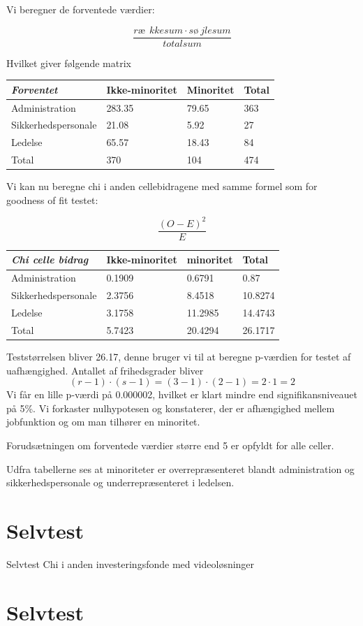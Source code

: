\documentclass[]{book}
\begin{document}
Vi beregner de forventede værdier:

\[\frac{ræ\ \ kkesum\cdot sø\ jlesum}{totalsum}\]

Hvilket giver følgende matrix

\begin{longtable}[]{@{}llll@{}}
\toprule
\textbf{\emph{Forventet}} & Ikke-minoritet & Minoritet & Total\tabularnewline
\midrule
\endhead
Administration & 283.35 & 79.65 & 363\tabularnewline
Sikkerhedspersonale & 21.08 & 5.92 & 27\tabularnewline
Ledelse & 65.57 & 18.43 & 84\tabularnewline
Total & 370 & 104 & 474\tabularnewline
\bottomrule
\end{longtable}

Vi kan nu beregne chi i anden cellebidragene med samme formel som for goodness of fit testet:

\[\frac{(O-E)^2}{E}\]

\begin{longtable}[]{@{}llll@{}}
\toprule
\textbf{\emph{Chi celle bidrag}} & Ikke-minoritet & minoritet & Total\tabularnewline
\midrule
\endhead
Administration & 0.1909 & 0.6791 & 0.87\tabularnewline
Sikkerhedspersonale & 2.3756 & 8.4518 & 10.8274\tabularnewline
Ledelse & 3.1758 & 11.2985 & 14.4743\tabularnewline
Total & 5.7423 & 20.4294 & 26.1717\tabularnewline
\bottomrule
\end{longtable}

Teststørrelsen bliver 26.17, denne bruger vi til at beregne p-værdien for testet af uafhængighed. Antallet af frihedsgrader bliver
\[(r-1)\cdot(s-1)=(3-1)\cdot(2-1)=2\cdot 1=2\]
Vi får en lille p-værdi på 0.000002, hvilket er klart mindre end signifikansniveauet på 5\%. Vi forkaster nulhypotesen og konstaterer, der er afhængighed mellem jobfunktion og om man tilhører en minoritet.

Forudsætningen om forventede værdier større end 5 er opfyldt for alle celler.

Udfra tabellerne ses at minoriteter er overrepræsenteret blandt administration og sikkerhedspersonale og underrepræsenteret i ledelsen.

\hypertarget{selvtest}{%
\section{Selvtest}\label{selvtest}}

Selvtest Chi i anden investeringsfonde med videoløsninger

\hypertarget{selvtest-1}{%
\section{Selvtest}\label{selvtest-1}}
\end{document}
